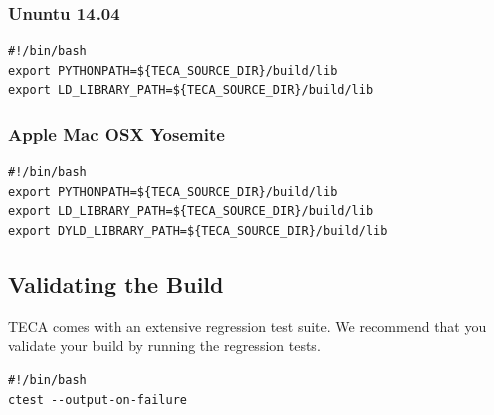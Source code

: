 \documentclass[a4paper,10pt,DIV=12]{scrreprt}
\begin{document}
\subsubsection{Ununtu 14.04}
\vspace{2mm}\hspace{0.2in}\begin{minipage}{0.8\textwidth}
\begin{verbatim}
#!/bin/bash
export PYTHONPATH=${TECA_SOURCE_DIR}/build/lib
export LD_LIBRARY_PATH=${TECA_SOURCE_DIR}/build/lib
\end{verbatim}
\end{minipage}\vspace{2mm}

\subsubsection{Apple Mac OSX Yosemite}
\vspace{2mm}\hspace{0.2in}\begin{minipage}{0.8\textwidth}
\begin{verbatim}
#!/bin/bash
export PYTHONPATH=${TECA_SOURCE_DIR}/build/lib
export LD_LIBRARY_PATH=${TECA_SOURCE_DIR}/build/lib
export DYLD_LIBRARY_PATH=${TECA_SOURCE_DIR}/build/lib
\end{verbatim}
\end{minipage}\vspace{2mm}

\subsection{Validating the Build}
TECA comes with an extensive regression test suite. We recommend that you validate
your build by running the regression tests.

\vspace{2mm}\hspace{0.2in}\begin{minipage}{0.8\textwidth}
\begin{verbatim}
#!/bin/bash
ctest --output-on-failure
\end{verbatim}
\end{minipage}\vspace{2mm}
\end{document}
